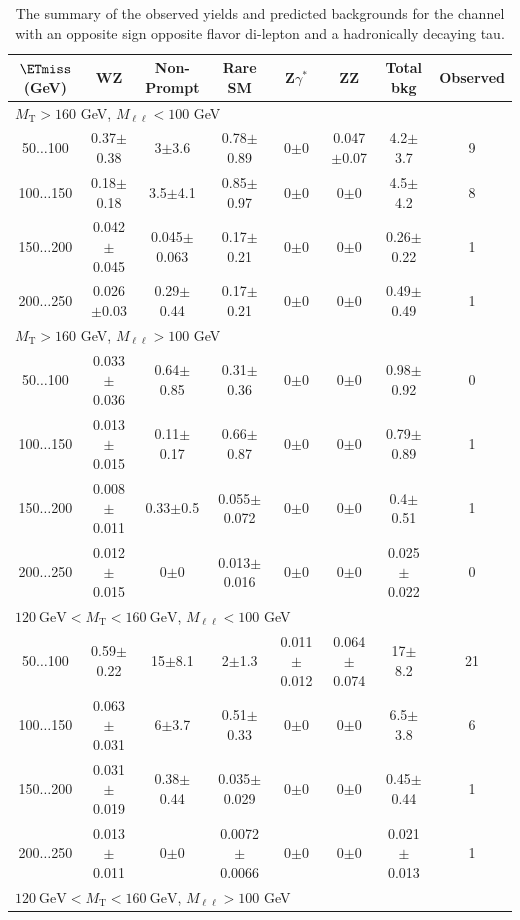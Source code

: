 \begin{landscape}
\begin{table}
\begin{center}
\caption{\label{tab:OSOFtau1} The summary of the observed yields and predicted backgrounds for the channel 
with an opposite sign opposite flavor di-lepton and a hadronically decaying tau. }
\begin{tabular}{| c | c c c c c c   c | }\hline\hline
$\ETmiss$ (GeV) & WZ & Non-Prompt & Rare SM & Z$\gamma^*$ & ZZ & Total bkg & Observed\\\hline\hline
\multicolumn{8}{l}{$M_{\text{T}} > 160$ GeV, $M_{\ell\ell} < 100$ GeV}\\\hline\hline
50$\dots$100&0.37$\pm$0.38&3$\pm$3.6&0.78$\pm$0.89&0$\pm$0&0.047$\pm$0.07&4.2$\pm$3.7&9\\
100$\dots$150&0.18$\pm$0.18&3.5$\pm$4.1&0.85$\pm$0.97&0$\pm$0&0$\pm$0&4.5$\pm$4.2&8\\
150$\dots$200&0.042$\pm$0.045&0.045$\pm$0.063&0.17$\pm$0.21&0$\pm$0&0$\pm$0&0.26$\pm$0.22&1\\
200$\dots$250&0.026$\pm$0.03&0.29$\pm$0.44&0.17$\pm$0.21&0$\pm$0&0$\pm$0&0.49$\pm$0.49&1\\
\hline\hline
\multicolumn{8}{l}{$M_{\text{T}} > 160$ GeV, $M_{\ell\ell} > 100$ GeV}\\\hline\hline
50$\dots$100&0.033$\pm$0.036&0.64$\pm$0.85&0.31$\pm$0.36&0$\pm$0&0$\pm$0&0.98$\pm$0.92&0\\
100$\dots$150&0.013$\pm$0.015&0.11$\pm$0.17&0.66$\pm$0.87&0$\pm$0&0$\pm$0&0.79$\pm$0.89&1\\
150$\dots$200&0.008$\pm$0.011&0.33$\pm$0.5&0.055$\pm$0.072&0$\pm$0&0$\pm$0&0.4$\pm$0.51&1\\
200$\dots$250&0.012$\pm$0.015&0$\pm$0&0.013$\pm$0.016&0$\pm$0&0$\pm$0&0.025$\pm$0.022&0\\
\hline\hline
\multicolumn{8}{l}{$120~\mathrm{GeV} < M_{\text{T}} < 160~\mathrm{GeV}$, $M_{\ell\ell} < 100$ GeV}\\\hline\hline
50$\dots$100&0.59$\pm$0.22&15$\pm$8.1&2$\pm$1.3&0.011$\pm$0.012&0.064$\pm$0.074&17$\pm$8.2&21\\
100$\dots$150&0.063$\pm$0.031&6$\pm$3.7&0.51$\pm$0.33&0$\pm$0&0$\pm$0&6.5$\pm$3.8&6\\
150$\dots$200&0.031$\pm$0.019&0.38$\pm$0.44&0.035$\pm$0.029&0$\pm$0&0$\pm$0&0.45$\pm$0.44&1\\
200$\dots$250&0.013$\pm$0.011&0$\pm$0&0.0072$\pm$0.0066&0$\pm$0&0$\pm$0&0.021$\pm$0.013&1\\
\hline\hline
\multicolumn{8}{l}{$120~\mathrm{GeV} < M_{\text{T}} < 160~\mathrm{GeV}$, $M_{\ell\ell} > 100$ GeV}\\\hline\hline

\end{tabular}
\end{center}
\end{table}
\end{landscape}
